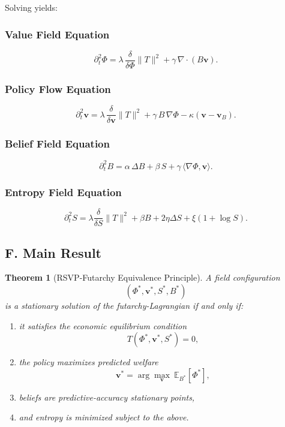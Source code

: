 \documentclass[12pt]{article}
\newtheorem{theorem}{Theorem}
\begin{document}
Solving yields:

\subsubsection*{Value Field Equation}
\[
\partial_t^2 \Phi
= 
\lambda\, \frac{\delta}{\delta \Phi}\|T\|^2
+ \gamma\, \nabla \cdot (B \mathbf{v}).
\]

\subsubsection*{Policy Flow Equation}
\[
\partial_t^2 \mathbf{v}
=
\lambda\, \frac{\delta}{\delta \mathbf{v}}\|T\|^2
+
\gamma\, B\, \nabla \Phi
-
\kappa( \mathbf{v} - \mathbf{v}_B ).
\]

\subsubsection*{Belief Field Equation}
\[
\partial_t^2 B
=
\alpha\, \Delta B
+ \beta\, S
+ \gamma\, \langle \nabla \Phi, \mathbf{v} \rangle.
\]

\subsubsection*{Entropy Field Equation}
\[
\partial_t^2 S
=
\lambda \frac{\delta}{\delta S}\|T\|^2
+ \beta B
+ 2\eta \Delta S
+ \xi(1+\log S).
\]

\subsection*{F. Main Result}

\begin{theorem}[RSVP-Futarchy Equivalence Principle]
A field configuration
\[
(\Phi^\ast, \mathbf{v}^\ast, S^\ast, B^\ast)
\]
is a stationary solution of the futarchy-Lagrangian if and only if:
\begin{enumerate}
\item it satisfies the economic equilibrium condition
\[
T(\Phi^\ast,\mathbf{v}^\ast,S^\ast)=0,
\]
\item the policy maximizes predicted welfare
\[
\mathbf{v}^\ast = \arg\max_{\mathbf{v}}
\ \mathbb{E}_{B^\ast}\!\left[\Phi^\ast\right],
\]
\item beliefs are predictive-accuracy stationary points,
\item and entropy is minimized subject to the above.
\end{enumerate}
\end{theorem}
\end{document}
